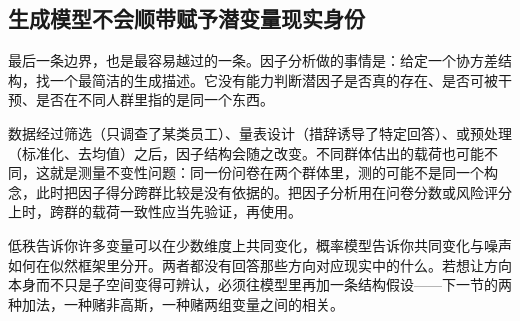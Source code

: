 \subsection{生成模型不会顺带赋予潜变量现实身份}

最后一条边界，也是最容易越过的一条。因子分析做的事情是：给定一个协方差结构，找一个最简洁的生成描述。它没有能力判断潜因子是否真的存在、是否可被干预、是否在不同人群里指的是同一个东西。

数据经过筛选（只调查了某类员工）、量表设计（措辞诱导了特定回答）、或预处理（标准化、去均值）之后，因子结构会随之改变。不同群体估出的载荷也可能不同，这就是测量不变性问题：同一份问卷在两个群体里，测的可能不是同一个构念，此时把因子得分跨群比较是没有依据的。把因子分析用在问卷分数或风险评分上时，跨群的载荷一致性应当先验证，再使用。

低秩告诉你许多变量可以在少数维度上共同变化，概率模型告诉你共同变化与噪声如何在似然框架里分开。两者都没有回答那些方向对应现实中的什么。若想让方向本身而不只是子空间变得可辨认，必须往模型里再加一条结构假设——下一节的两种加法，一种赌非高斯，一种赌两组变量之间的相关。
